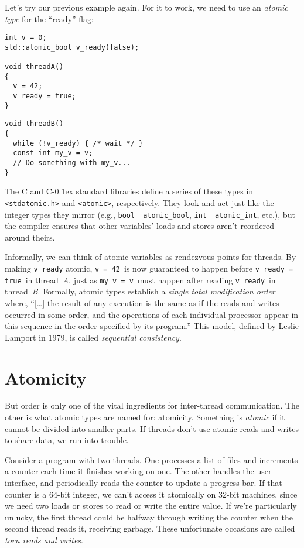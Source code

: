 \documentclass[fontsize=\bodyfontsize, numbers=endperiod]{scrartcl}
\newcommand{\codesize}{\fontsize{\bodyfontsize}{\bodybaselineskip}}
\newcommand{\monobox}[1]{\mbox{\texttt{#1}}}
\newcommand{\cpp}[1]{C\kern-0.1ex\raisebox{0.15ex}{\texttt{++}}{\addfontfeature{Numbers=LowercaseOff}#1}}
\newcommand{\introduce}[1]{\textit{#1}}
\newenvironment{colfigure}
  {\par\vspace{1\baselineskip minus 0.5\baselineskip}\noindent\minipage{\linewidth}}
  {\endminipage\vspace{1\baselineskip minus 0.7\baselineskip}}
\begin{document}
\begin{multicols}{2}
Let's try our previous example again.
For it to work, we need to use an
\introduce{atomic type} for the ``ready'' flag:
\begin{colfigure}
\begin{verbatim}
int v = 0;
std::atomic_bool v_ready(false);

void threadA()
{
  v = 42;
  v_ready = true;
}
\end{verbatim}
\end{colfigure}
\begin{colfigure}
\begin{verbatim}
void threadB()
{
  while (!v_ready) { /* wait */ }
  const int my_v = v;
  // Do something with my_v...
}
\end{verbatim}
\end{colfigure}
The C and \cpp{} standard libraries define a series of these types
in \texttt{<stdatomic.h>} and \texttt{<atomic>}, respectively.
They look and act just like the integer types they mirror
(e.g., \monobox{bool}~\textrightarrow~\monobox{atomic\_bool},
\monobox{int}~\textrightarrow~\monobox{atomic\_int}, etc.),
but the compiler ensures that other variables' loads and stores aren't
reordered around theirs.

Informally, we can think of atomic variables
as rendezvous points for threads.
By making \monobox{v\_ready} atomic,
\monobox{v = 42}\, is now guaranteed to happen before
\monobox{v\_ready = true}\, in thread~\textit{A},
just as \monobox{my\_v = v}\, must happen after reading \monobox{v\_ready}\,
in thread~\textit{B}.
Formally, atomic types establish a \textit{single total modification order}
where,
``[\ldots] the result of any execution is the same as if the reads and writes
occurred in some order, and the operations of each individual
processor appear in this sequence in the order specified by its program.''
This model, defined by Leslie Lamport in 1979,
is called \introduce{sequential consistency}.

\section{Atomicity}
\label{atomicity}
But order is only one of the vital ingredients for inter-thread communication.
The other is what atomic types are named for: atomicity.
Something is \introduce{atomic} if it cannot be divided into smaller parts.
If threads don't use atomic reads and writes to share data, we run into trouble.

Consider a program with two threads.
One processes a list of files
and increments a counter each time it finishes working on one.
The other handles the user interface, and periodically reads
the counter to update a progress bar.
If that counter is a 64-bit integer, we can't access it atomically on 32-bit
machines, since we need two loads or stores to read or write the entire value.
If we're particularly unlucky,
the first thread could be halfway through writing the counter
when the second thread reads it, receiving garbage.
These unfortunate occasions are called \introduce{torn reads and writes}.


\end{multicols}
\end{document}
